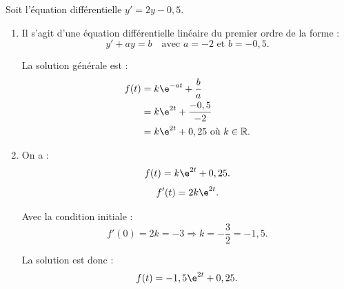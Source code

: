 \medskip

Soit l'équation différentielle $y' = 2y - 0,5$.

\begin{enumerate}
    \item Il s'agit d'une équation différentielle linéaire du premier ordre de la forme :
\[y' + ay = b \quad \text{avec } a = -2 \text{ et } b = -0,5.\]

La solution générale est :
\begin{align*}
f(t) &= k\e^{-at} + \dfrac{b}{a} \\
&= k\e^{2t} + \dfrac{-0,5}{-2} \\
&= k\e^{2t} + 0,25 \text{ où } k \in \mathbb{R}.
\end{align*}

    \item On a :
\[f(t) = k\e^{2t} + 0,25.\]
\[f'(t) = 2k\e^{2t}.\]

Avec la condition initiale :
\[f'(0) = 2k = -3 \Rightarrow k = -\dfrac{3}{2} = -1,5.\]

La solution est donc :
\[f(t) = -1,5\e^{2t} + 0,25.\]
\end{enumerate}

\bigskip
